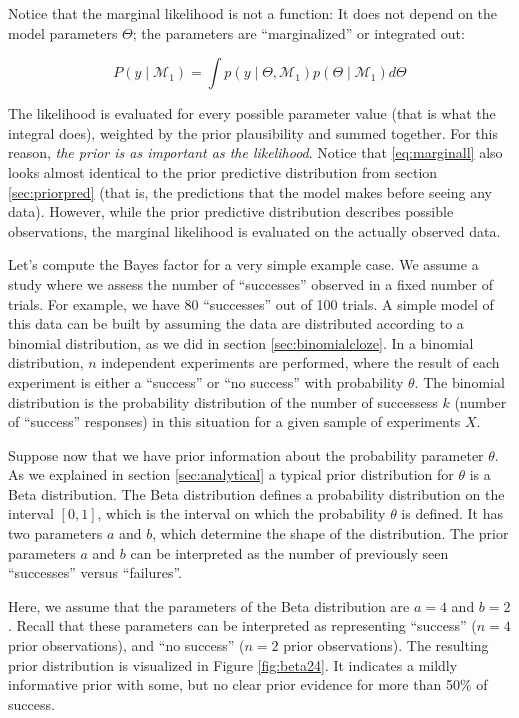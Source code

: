 \documentclass[12pt,]{krantz}
\theoremstyle{definition}
\theoremstyle{definition}
\theoremstyle{definition}
\theoremstyle{remark}
\begin{document}
Notice that the marginal likelihood is not a function: It does not
depend on the model parameters \(\Theta\); the parameters are
``marginalized'' or integrated out:

\begin{equation}
P(y \mid \mathcal{M}_1) = \int p(y \mid \Theta, \mathcal{M}_1) p(\Theta \mid \mathcal{M}_1) d \Theta
\label{eq:marginall}
\end{equation}

The likelihood is evaluated for every possible parameter value (that is
what the integral does), weighted by the prior plausibility and summed
together. For this reason, \emph{the prior is as important as the
likelihood}. Notice that \eqref{eq:marginall} also looks almost identical
to the prior predictive distribution from section \ref{sec:priorpred}
(that is, the predictions that the model makes before seeing any data).
However, while the prior predictive distribution describes possible
observations, the marginal likelihood is evaluated on the actually
observed data.

Let's compute the Bayes factor for a very simple example case. We assume
a study where we assess the number of ``successes'' observed in a fixed
number of trials. For example, we have 80 ``successes'' out of 100
trials. A simple model of this data can be built by assuming the data
are distributed according to a binomial distribution, as we did in
section \ref{sec:binomialcloze}. In a binomial distribution, \(n\)
independent experiments are performed, where the result of each
experiment is either a ``success'' or ``no success'' with probability
\(\theta\). The binomial distribution is the probability distribution of
the number of successess \(k\) (number of ``success'' responses) in this
situation for a given sample of experiments \(X\).

Suppose now that we have prior information about the probability
parameter \(\theta\). As we explained in section \ref{sec:analytical} a
typical prior distribution for \(\theta\) is a Beta distribution. The
Beta distribution defines a probability distribution on the interval
\([0, 1]\), which is the interval on which the probability \(\theta\) is
defined. It has two parameters \(a\) and \(b\), which determine the
shape of the distribution. The prior parameters \(a\) and \(b\) can be
interpreted as the number of previously seen ``successes'' versus
``failures''.

Here, we assume that the parameters of the Beta distribution are \(a=4\)
and \(b=2\). Recall that these parameters can be interpreted as
representing ``success'' (\(n=4\) prior observations), and ``no
success'' (\(n=2\) prior observations). The resulting prior distribution
is visualized in Figure \ref{fig:beta24}. It indicates a mildly
informative prior with some, but no clear prior evidence for more than
50\% of success.
\end{document}
